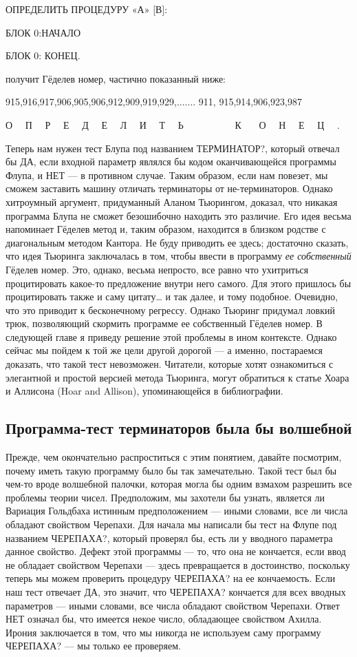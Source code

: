 \documentclass[../main.tex]{subfiles}
\begin{document}
ОПРЕДЕЛИТЬ ПРОЦЕДУРУ «А» {[}В{]}:

БЛОК 0:НАЧАЛО

БЛОК 0: КОНЕЦ.

получит Гёделев номер, частично показанный ниже:

915,916,917,906,905,906,912,909,919,929,....... 911, 915,914,906,923,987

О~~ П~~ Р~~ Е~~ Д~~ Е~~ Л~~ И~~ Т~~ Ь~~~~~~~~~~ К~~~ О~~ Н~~ Е~~ Ц~~ .

Теперь нам нужен тест Блупа под названием ТЕРМИНАТОР?, который отвечал бы ДА, если входной параметр являлся бы кодом оканчивающейся программы Флупа, и НЕТ --- в противном случае. Таким образом, если нам повезет, мы сможем заставить машину отличать терминаторы от не-терминаторов. Однако хитроумный аргумент, придуманный Аланом Тьюрингом, доказал, что никакая программа Блупа не сможет безошибочно находить это различие. Его идея весьма напоминает Гёделев метод и, таким образом, находится в близком родстве с диагональным методом Кантора. Не буду приводить ее здесь; достаточно сказать, что идея Тьюринга заключалась в том, чтобы ввести в программу \emph{ее собственный} Гёделев номер. Это, однако, весьма непросто, все равно что ухитриться процитировать какое-то предложение внутри него самого. Для этого пришлось бы процитировать также и саму цитату\ldots{} и так далее, и тому подобное. Очевидно, что это приводит к бесконечному регрессу. Однако Тьюринг придумал ловкий трюк, позволяющий скормить программе ее собственный Гёделев номер. В следующей главе я приведу решение этой проблемы в ином контексте. Однако сейчас мы пойдем к той же цели другой дорогой --- а именно, постараемся доказать, что такой тест невозможен. Читатели, которые хотят ознакомиться с элегантной и простой версией метода Тьюринга, могут обратиться к статье Хоара и Аллисона (Hoar and Allison), упоминающейся в библиографии.


\subsection{Программа-тест терминаторов была бы волшебной}

Прежде, чем окончательно распроститься с этим понятием, давайте посмотрим, почему иметь такую программу было бы так замечательно. Такой тест был бы чем-то вроде волшебной палочки, которая могла бы одним взмахом разрешить все проблемы теории чисел. Предположим, мы захотели бы узнать, является ли Вариация Гольдбаха истинным предположением --- иными словами, все ли числа обладают свойством Черепахи. Для начала мы написали бы тест на Флупе под названием ЧЕРЕПАХА?, который проверял бы, есть ли у вводного параметра данное свойство. Дефект этой программы --- то, что она не кончается, если ввод не обладает свойством Черепахи --- здесь превращается в достоинство, поскольку теперь мы можем проверить процедуру ЧЕРЕПАХА? на ее кончаемость. Если наш тест отвечает ДА, это значит, что ЧЕРЕПАХА? кончается для всех вводных параметров --- иными словами, все числа обладают свойством Черепахи. Ответ НЕТ означал бы, что имеется некое число, обладающее свойством Ахилла. Ирония заключается в том, что мы никогда не используем саму программу ЧЕРЕПАХА? --- мы только ее проверяем.
\end{document}
